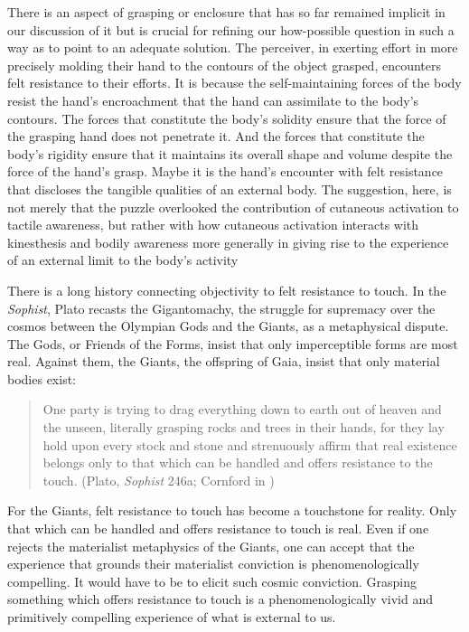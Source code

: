 \documentclass[12pt]{article}
\begin{document}
There is an aspect of grasping or enclosure that has so far remained implicit in our discussion of it but is crucial for refining our how-possible question in such a way as to point to an adequate solution. The perceiver, in exerting effort in more precisely molding their hand to the contours of the object grasped, encounters felt resistance to their efforts. It is because the self-maintaining forces of the body resist the hand's encroachment that the hand can assimilate to the body's contours. The forces that constitute the body's solidity ensure that the force of the grasping hand does not penetrate it. And the forces that constitute the body's rigidity ensure that it maintains its overall shape and volume despite the force of the hand's grasp. Maybe it is the hand's encounter with felt resistance that discloses the tangible qualities of an external body. The suggestion, here, is not merely that the puzzle overlooked the contribution of cutaneous activation to tactile awareness, but rather with how cutaneous activation interacts with kinesthesis and bodily awareness more generally in giving rise to the experience of an external limit to the body's activity

There is a long history connecting objectivity to felt resistance to touch. In the \emph{Sophist}, Plato recasts the Gigantomachy, the struggle for supremacy over the cosmos between the Olympian Gods and the Giants, as a metaphysical dispute. The Gods, or Friends of the Forms, insist that only imperceptible forms are most real. Against them, the Giants, the offspring of Gaia, insist that only material bodies exist:
\begin{quote}
	One party is trying to drag everything down to earth out of heaven and the unseen, literally grasping rocks and trees in their hands, for they lay hold upon every stock and stone and strenuously affirm that real existence belongs only to that which can be handled and offers resistance to the touch. (Plato, \emph{Sophist} 246a; Cornford in \citealt[990]{Hamilton:1989fk})
\end{quote}
For the Giants, felt resistance to touch has become a touchstone for reality. Only that which can be handled and offers resistance to touch is real. Even if one rejects the materialist metaphysics of the Giants, one can accept that the experience that grounds their materialist conviction is phenomenologically compelling. It would have to be to elicit such cosmic conviction. Grasping something which offers resistance to touch is a phenomenologically vivid and primitively compelling experience of what is external to us. 
\end{document}
